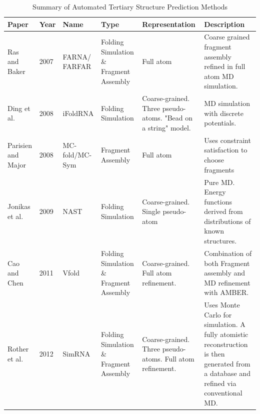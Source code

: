 \documentclass[journal]{IEEEtran}
\begin{document}
\begin{table}[t]
\centering
\caption{Summary of Automated Tertiary Structure Prediction Methods}
\label{table:tertiary-prediction-papers}
\begin{tabular}{|l|l|p{1.5cm}|p{3cm}|p{3cm}|p{5cm}|}
\hline
\textbf{Paper}                          & \textbf{Year} & \textbf{Name}               & \textbf{Type}                           & \textbf{Representation}                                       & \textbf{Description}    \\ \hline
                                                                                                             
Ras and Baker \cite{das2007automated}   & 2007          & FARNA/ FARFAR                & Folding Simulation \& Fragment Assembly & Full atom                                                     & Coarse grained fragment assembly refined in full atom MD simulation.                                                                 \\ \hline

Ding et al. \cite{ding2008ab}           & 2008          & iFoldRNA & Folding Simulation                      & Coarse-grained. Three pseudo-atoms. "Bead on a string" model. & MD simulation with discrete potentials.                                                                                              \\ \hline

Parisien and Major\cite{parisien2008mc} & 2008          & MC-fold/MC-Sym              & Fragment Assembly                       & Full atom                                                     & Uses constraint satisfaction to choose fragments    \\ \hline


Jonikas et al.\cite{jonikas2009coarse}  & 2009          & NAST                        & Folding Simulation                      & Coarse-grained. Single pseudo-atom                            & Pure MD. Energy functions derived from distributions of known structures.                                                            \\ \hline

Cao and Chen \cite{cao2011physics}      & 2011          & Vfold                       & Folding Simulation \& Fragment Assembly & Coarse-grained. Full atom refinement.                         & Combination of both Fragment assembly and MD refinement with AMBER.                                                                  \\ \hline

Rother et al. \cite{rother2012template} & 2012          & SimRNA                      & Folding Simulation \& Fragment Assembly & Coarse-grained. Three pseudo-atoms. Full atom refinement.     & Uses Monte Carlo for simulation. A fully atomistic reconstruction is then generated from a database and refined via conventional MD. \\ \hline
\end{tabular}
\end{table}
\end{document}
